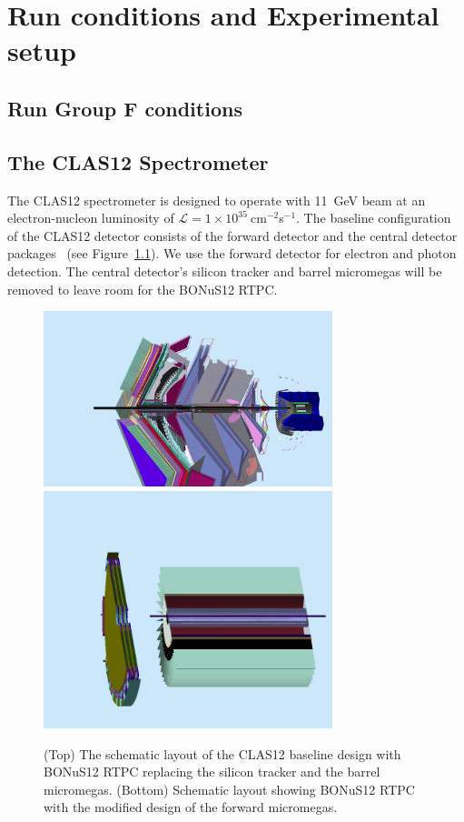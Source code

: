 \chapter{Run conditions and Experimental setup}
\label{chap:physics}

\section{Run Group F conditions}



\section{The CLAS12 Spectrometer}
The CLAS12 spectrometer is designed to operate with 11~GeV beam at an 
electron-nucleon luminosity of $\mathcal{L} = 
1\times10^{35}~$cm$^{-2}$s$^{-1}$. The baseline configuration of the CLAS12 
detector consists of the forward detector and the central detector 
packages~\cite{CD} (see Figure~\ref{fig:fd}). We use the forward detector for 
electron and photon detection. The central detector's silicon tracker and 
barrel micromegas will be removed to leave room for the BONuS12 RTPC.  

\begin{figure}
  \begin{center}
    \includegraphics[angle=0, width=0.75\textwidth]{figures/clas12_bonus12.png}
    \includegraphics[angle=0, width=0.75\textwidth]{figures/bonus12_fmt.png}
     \caption{(Top) The schematic layout of the CLAS12 baseline design with 
     BONuS12 RTPC replacing the silicon tracker and the barrel micromegas.  
     (Bottom) Schematic layout showing BONuS12 RTPC with the modified design of 
     the forward micromegas.}
    \label{fig:fd}
  \end{center}
\end{figure}

